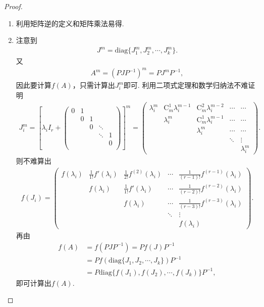 \documentclass[../../main.tex]{subfiles}
\begin{document}
\begin{proof}
\begin{enumerate}[(1)]
\item 利用矩阵逆的定义和矩阵乘法易得.

\item 注意到
\begin{align*}
J^m = \mathrm{diag}\{J_1^m,J_2^m,\cdots,J_k^m\}.
\end{align*}
又
\begin{align*}
A^m = (PJP^{-1})^m = PJ^mP^{-1},
\end{align*}
因此要计算\(f(A)\)，只需计算出\(J_i^m\)即可. 
利用二项式定理和数学归纳法不难证明
\begin{align*}
J_{i}^{m}=\left[ \lambda _iI_r+\left( \begin{matrix}
0&		1&		&		&		\\
&		0&		1&		&		\\
&		&		0&		\ddots&		\\
&		&		&		\ddots&		1\\
&		&		&		&		0\\
\end{matrix} \right) \right] ^m=\begin{pmatrix}
\lambda_i^m & \mathrm{C}_m^1\lambda_i^{m - 1} & \mathrm{C}_m^2\lambda_i^{m - 2} & \cdots & \cdots \\
& \lambda_i^m & \mathrm{C}_m^1\lambda_i^{m - 1} & \cdots & \cdots \\
& & \lambda_i^m & \cdots & \cdots \\
& & & \ddots & \vdots \\
& & & & \lambda_i^m
\end{pmatrix}.
\end{align*}
则不难算出
\begin{align*}
f(J_i)= \begin{pmatrix}
f(\lambda_i) & \frac{1}{1!}f'(\lambda_i) & \frac{1}{2!}f^{(2)}(\lambda_i) & \cdots & \frac{1}{(r - 1)!}f^{(r - 1)}(\lambda_i) \\
 & f(\lambda_i) & \frac{1}{1!}f'(\lambda_i) & \cdots & \frac{1}{(r - 2)!}f^{(r - 2)}(\lambda_i) \\
 & & f(\lambda_i) & \cdots & \frac{1}{(r - 3)!}f^{(r - 3)}(\lambda_i) \\
 & & & \ddots & \vdots \\
 & & & & f(\lambda_i)
\end{pmatrix}. 
\end{align*}
再由
\begin{align*}
f(A) &= f(PJP^{-1}) = Pf(J)P^{-1} \\
&= P f(\mathrm{diag}\{J_1,J_2,\cdots,J_k\})P^{-1} \\
&= P \mathrm{diag}\{f(J_1),f(J_2),\cdots,f(J_k)\}P^{-1},
\end{align*}
即可计算出\(f(A)\). 
\end{enumerate}
\end{proof}
\end{document}
